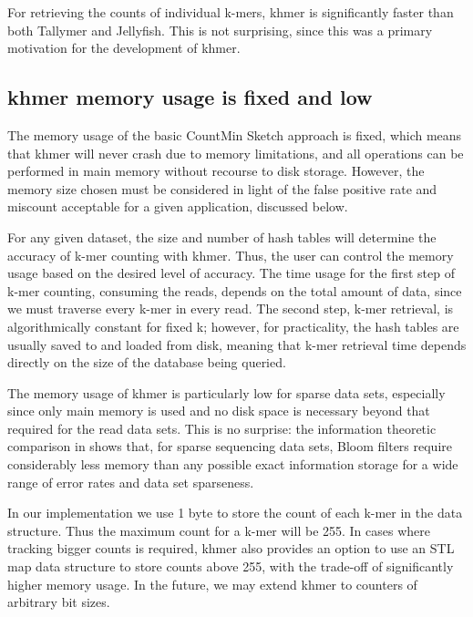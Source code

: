 \documentclass{article}
\begin{document}
For retrieving the counts of individual k-mers, khmer is significantly faster than both
Tallymer and Jellyfish.  This is not surprising, since this was a
primary motivation for the development of khmer.


\subsection{khmer memory usage is fixed and low}

The memory usage of the basic CountMin Sketch approach is fixed, which
means that khmer will never crash due to memory limitations, and all
operations can be performed in main memory without recourse to disk
storage.  However, the memory size chosen must be considered in light
of the false positive rate and miscount acceptable for a given
application, discussed below.

For any given dataset, the size and number of hash tables will
determine the accuracy of k-mer counting with khmer.  Thus, the user
can control the memory usage based on the desired level of
accuracy. The time usage for the first step of k-mer counting,
consuming the reads, depends on the
total amount of data, since we must traverse every k-mer in every read.
The second step, k-mer retrieval, is algorithmically constant for
fixed k; however, for practicality, the hash tables are usually saved
to and loaded from disk, meaning that k-mer retrieval time depends directly
on the size of the database being queried.

The memory usage of khmer is particularly low for sparse data sets,
especially since only main memory is used and no disk space is
necessary beyond that required for the read data sets.  This is no
surprise: the information theoretic comparison in
\cite{Pell2012} shows that, for sparse sequencing data sets, Bloom
filters require considerably less memory than any possible exact
information storage for a wide range of error rates and data set
sparseness.

In our implementation we use 1 byte to store the count of each k-mer
in the data structure. Thus the maximum count for a k-mer will be 255.
In cases where tracking bigger counts is required, khmer also provides
an option to use an STL map data structure to store counts above 255,
with the trade-off of significantly higher memory usage.  In the
future, we may extend khmer to counters of arbitrary bit sizes.

\end{document}

